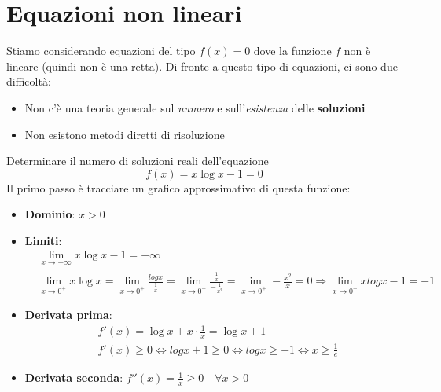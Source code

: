 \newpage
\section{Equazioni non lineari}
Stiamo considerando equazioni del tipo $f(x)=0$ dove la funzione $f$ non è lineare (quindi non è una retta). Di fronte a questo tipo di equazioni, ci sono due difficoltà:
\begin{itemize}
	\item Non c'è una teoria generale sul \textit{numero} e sull'\textit{esistenza} delle \textbf{soluzioni}
	\item Non esistono metodi diretti di risoluzione
\end{itemize}

\begin{example}
	Determinare il numero di soluzioni reali dell'equazione
	\begin{equation*}
		f(x)=x \log x -1 = 0
	\end{equation*}
	Il primo passo è tracciare un grafico approssimativo di questa funzione:
	\begin{itemize}
		\item \textbf{Dominio}: $x>0$
		\item \textbf{Limiti}:
		\begin{align*}
			& \lim_{x \to + \infty} x \log x -1 = + \infty \\
			& \lim_{x \to 0^+} x \log x = \lim_{x \to 0^+} \frac{log x}{\frac{1}{x}} = \lim_{x \to 0^+} \frac{\frac{1}{x}}{-\frac{1}{x^2}} = \lim_{x \to 0^+} - \frac{x^2}{x} = 0 \Longrightarrow \lim_{x \to 0^+} x log x -1 = -1 
		\end{align*}
		\item \textbf{Derivata prima}: \begin{align*}
			& f'(x) = \log x + x \cdot \frac{1}{x} = \log x + 1 \\
			& f'(x) \geq 0 \Leftrightarrow log x + 1 \geq 0 \Leftrightarrow log x \geq -1 \Leftrightarrow x \geq \frac{1}{e}
		\end{align*}
		\item \textbf{Derivata seconda}: $f''(x)=\frac{1}{x} \geq 0 \quad \forall x > 0$
	\end{itemize}
	\begin{center}
\end{center}
\end{example}
